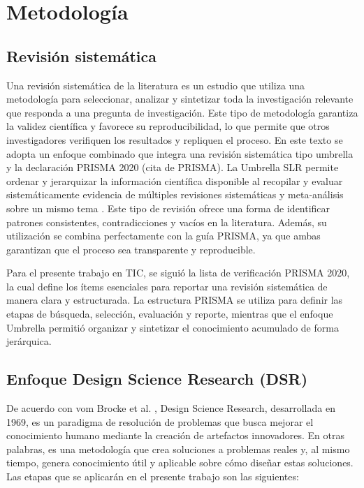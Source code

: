 \chapter{Metodología}
\section{Revisión sistemática}
Una revisión sistemática de la literatura es un estudio que utiliza una metodología para seleccionar, analizar y sintetizar toda la investigación relevante que responda a una pregunta de investigación. Este tipo de metodología garantiza la validez científica y favorece su reproducibilidad, lo que permite que otros investigadores verifiquen los resultados y repliquen el proceso.
En este texto se adopta un enfoque combinado que integra una revisión sistemática tipo umbrella \cite{peffers2008design} y la declaración PRISMA 2020 (cita de PRISMA).
La Umbrella SLR permite ordenar y jerarquizar la información científica disponible al recopilar y evaluar sistemáticamente evidencia de múltiples revisiones sistemáticas y meta-análisis sobre un mismo tema \cite{Papatheodorou2019}. Este tipo de revisión ofrece una forma de identificar patrones consistentes, contradicciones y vacíos en la literatura. Además, su utilización se combina perfectamente con la guía PRISMA, ya que ambas garantizan que el proceso sea transparente y reproducible.

Para el presente trabajo en TIC, se siguió la lista de verificación PRISMA 2020, la cual define los ítems esenciales para reportar una revisión sistemática de manera clara y estructurada. La estructura PRISMA se utiliza para definir las etapas de búsqueda, selección, evaluación y reporte, mientras que el enfoque Umbrella permitió organizar y sintetizar el conocimiento acumulado de forma jerárquica.

\section{Enfoque Design Science Research (DSR)}
De acuerdo con vom Brocke et al. \cite{vomBrocke2020}, Design Science Research, desarrollada en 1969, es un paradigma de resolución de problemas que busca mejorar el conocimiento humano mediante la creación de artefactos innovadores. En otras palabras, es una metodología que crea soluciones a problemas reales y, al mismo tiempo, genera conocimiento útil y aplicable sobre cómo diseñar estas soluciones. Las etapas que se aplicarán en el presente trabajo son las siguientes:

